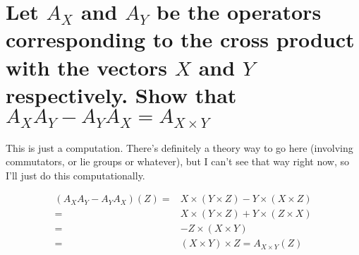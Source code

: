 \documentclass[12pt]{amsart}
\begin{document}
\section{Let $A_X$ and $A_Y$ be the operators corresponding to the cross product with the vectors $X$ and $Y$ respectively. Show that $A_XA_Y-A_YA_X=A_{X\times Y}$}
This is just a computation. There's definitely a theory way to go here (involving commutators, or lie groups or whatever), but I can't see that way right now, so I'll just do this computationally.
\begin{comment}\begin{align*}
	\left(A_xA_y-A_yA_x\right)(z)=&x\times(y\times z)-y\times(x\times z)
	\\=&x\times\left((y_2z_3-y_3z_2)i-(y_1z_3-y_3z_1)j+(y_2z_3-y_3z_2)k \right)
	\\&- y\times\left((x_2z_3-x_3z_2)i-(x_1z_3-x_3z_1)j+(x_2z_3-x_3z_2)k \right)
	\\=&(x_2y_2z_3-x_2y_3z_2+x_3y_1z_3-x_3y_3z_1)i
	\\&-(x_1y_2z_3-x_1y_3z_2-x_3y_2z_3+x_3y_3z_2)j
	\\&+
\end{align*}
\end{comment}
\begin{align*}
	(A_XA_Y-A_YA_X)(Z)=&X\times (Y\times Z)-Y\times(X\times Z)
	\\=&X\times(Y\times Z)+Y\times(Z\times X)
	\\=&-Z\times(X\times Y)
	\\=&(X\times Y)\times Z=A_{X\times Y}(Z)
\end{align*}
\end{document}

